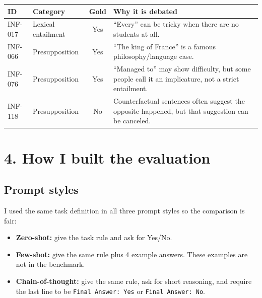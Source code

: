 \documentclass[11pt, a4paper]{article}
\begin{document}
\begin{table}[htbp]
\centering
\small
\setlength{\tabcolsep}{6pt}
\renewcommand{\arraystretch}{1.25}
\begin{tabularx}{\textwidth}{l l c >{\raggedright\arraybackslash}X}
\toprule
\rowcolor{labeltint}
\textbf{ID} & \textbf{Category} & \textbf{Gold} & \textbf{Why it is debated} \\
\midrule
INF-017 & Lexical entailment & Yes & ``Every'' can be tricky when there are no students at all. \\
\rowcolor{rowtint}
INF-066 & Presupposition & Yes & ``The king of France'' is a famous philosophy/language case. \\
INF-076 & Presupposition & Yes & ``Managed to'' may show difficulty, but some people call it an implicature, not a strict entailment. \\
\rowcolor{rowtint}
INF-118 & Presupposition & No & Counterfactual sentences often suggest the opposite happened, but that suggestion can be canceled. \\
\bottomrule
\end{tabularx}
\end{table}

\FloatBarrier
{}
\section*{\color{bambergnavy} 4. How I built the evaluation}
\subsection*{\color{bambergnavy} Prompt styles}
I used the same task definition in all three prompt styles so the comparison is fair:
\begin{itemize}[leftmargin=*]
    \item \textbf{Zero-shot:} give the task rule and ask for Yes/No.
    \item \textbf{Few-shot:} give the same rule plus 4 example answers. These examples are not in the benchmark.
    \item \textbf{Chain-of-thought:} give the same rule, ask for short reasoning, and require the last line to be \texttt{Final Answer: Yes} or \texttt{Final Answer: No}.
\end{itemize}
\end{document}
